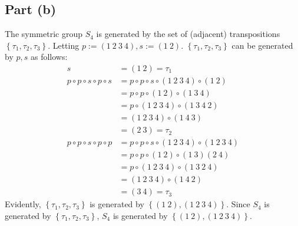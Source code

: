 \documentclass{article}
\begin{document}
\subsection*{Part (b)}
The symmetric group $S_4$ is generated by the set of (adjacent) transpositions $\left\{\tau_1, \tau_2, \tau_3\right\}$. Letting $p := \left(1~2~3~4\right), s := \left(1~2\right)$. $\left\{\tau_1, \tau_2, \tau_3\right\}$ can be generated by $p, s$ as follows:
\begin{equation}
    \begin{split}
        s & = \left(1~2\right) = \tau_1 \\
        p \circ p \circ s \circ p \circ s & = p \circ p \circ s \circ \left(1~2~3~4\right) \circ \left(1~2\right) \\
        & = p \circ p \circ \left(1~2\right) \circ \left(1~3~4\right) \\
        & = p \circ \left(1~2~3~4\right) \circ \left(1~3~4~2\right) \\
        & = \left(1~2~3~4\right) \circ \left(1~4~3\right) \\
        & = \left(2~3\right) = \tau_2 \\
        p \circ p \circ s \circ p \circ p & = p \circ p \circ s \circ \left(1~2~3~4\right) \circ \left(1~2~3~4\right) \\
        & = p \circ p \circ \left(1~2\right) \circ \left(1~3\right)\left(2~4\right) \\
        & = p \circ \left(1~2~3~4\right) \circ \left(1~3~2~4\right) \\
        & = \left(1~2~3~4\right) \circ \left(1~4~2\right) \\
        & = \left(3~4\right) = \tau_3
    \end{split}
\end{equation}
Evidently, $\left\{\tau_1, \tau_2, \tau_3\right\}$ is generated by $\left\{\left(1~2\right), \left(1~2~3~4\right)\right\}$. Since $S_4$ is generated by $\left\{\tau_1, \tau_2, \tau_3\right\}$, $S_4$ is generated by $\left\{\left(1~2\right), \left(1~2~3~4\right)\right\}$.

\clearpage

\problem
\end{document}
